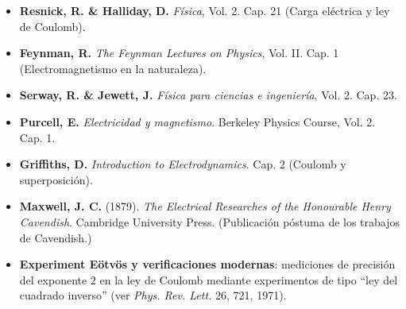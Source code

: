 \documentclass[12pt,a4paper]{article}
\begin{document}
\begin{refbox}
\begin{itemize}[nosep]
  \item \textbf{Resnick, R. \& Halliday, D.} \textit{Física}, Vol. 2. Cap. 21 (Carga eléctrica y ley de Coulomb).
  \item \textbf{Feynman, R.} \textit{The Feynman Lectures on Physics}, Vol. II. Cap. 1 (Electromagnetismo en la naturaleza).
  \item \textbf{Serway, R. \& Jewett, J.} \textit{Física para ciencias e ingeniería}, Vol. 2. Cap. 23.
  \item \textbf{Purcell, E.} \textit{Electricidad y magnetismo}. Berkeley Physics Course, Vol. 2. Cap. 1.
  \item \textbf{Griffiths, D.} \textit{Introduction to Electrodynamics}. Cap. 2 (Coulomb y superposición).
  \item \textbf{Maxwell, J. C.} (1879). \textit{The Electrical Researches of the Honourable Henry Cavendish}. Cambridge University Press. (Publicación póstuma de los trabajos de Cavendish.)
  \item \textbf{Experiment Eötvös y verificaciones modernas}: mediciones de precisión del exponente $2$ en la ley de Coulomb mediante experimentos de tipo ``ley del cuadrado inverso'' (ver \textit{Phys. Rev. Lett.} 26, 721, 1971).
\end{itemize}
\end{refbox}
\end{document}
